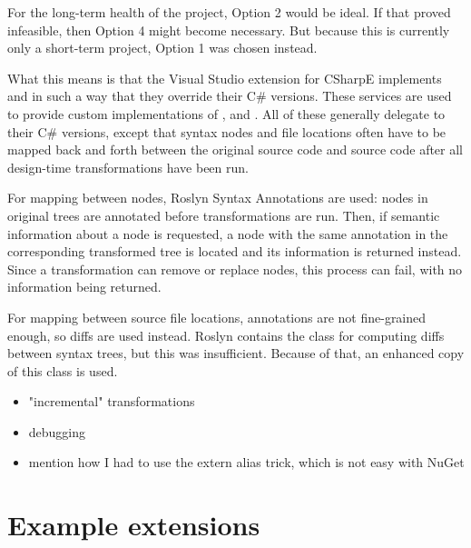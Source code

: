 For the long-term health of the project, Option 2 would be ideal. If that proved infeasible, then Option 4 might become necessary. But because this is currently only a short-term project, Option 1 was chosen instead.

What this means is that the Visual Studio extension for CSharpE implements  and  in such a way that they override their C\# versions. These services are used to provide custom implementations of ,  and . All of these generally delegate to their C\# versions, except that syntax nodes and file locations often have to be mapped back and forth between the original source code and source code after all design-time transformations have been run.

For mapping between nodes, Roslyn Syntax Annotations are used: nodes in original trees are annotated before transformations are run. Then, if semantic information about a node is requested, a node with the same annotation in the corresponding transformed tree is located and its information is returned instead. Since a transformation can remove or replace nodes, this process can fail, with no information being returned.

For mapping between source file locations, annotations are not fine-grained enough, so diffs are used instead. Roslyn contains the  class for computing diffs between syntax trees, but this was insufficient. Because of that, an enhanced copy of this class is used.

\begin{itemize}
\item "incremental" transformations
\item debugging
\item mention how I had to use the extern alias trick, which is not easy with NuGet
\end{itemize}

\section{Example extensions}
